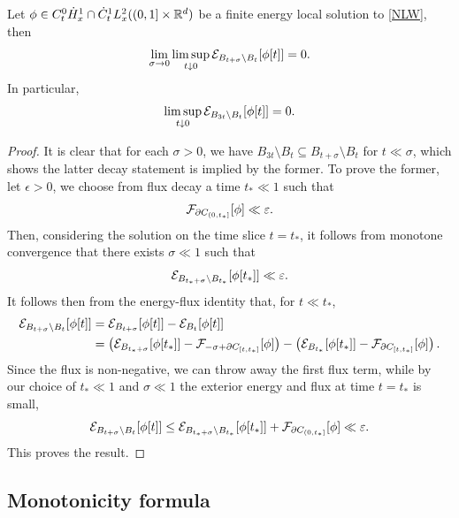 \begin{corollary}\label{cor:exterior}
	Let $\phi \in C^0_{t} \dot H^1_x \cap \dot C^1_{t} L^2_x ((0, 1] \times \mathbb R^d)$ be a finite energy local solution to \eqref{NLW}, then
		\[
			\lim_{\sigma \to 0} \limsup_{t \downarrow 0} \mathcal E_{B_{t + \sigma} \setminus B_{t}} [\phi[t]] = 0.
		\]
	In particular, 
		\[
			\limsup_{t \downarrow 0} \mathcal E_{B_{3t} \setminus B_{t}} [\phi[t]] = 0.
		\]	
\end{corollary}

\begin{proof}
	It is clear that for each $\sigma > 0$, we have $B_{3t} \setminus B_t \subseteq B_{t + \sigma} \setminus B_t$ for $t \ll \sigma$, which shows the latter decay statement is implied by the former. To prove the former, let $\epsilon > 0$, we choose from flux decay a time $t_* \ll 1$ such that
		\[
			\mathcal F_{\partial C_{(0, t_*]}} [\phi] \ll \varepsilon. 
		\]
	Then, considering the solution on the time slice $t = t_*$, it follows from monotone convergence that there exists $\sigma \ll 1$ such that 
		\[
			\mathcal E_{B_{t_* + \sigma} \setminus B_{t_*}} [\phi[t_*]] \ll \varepsilon.
		\]	
	It follows then from the energy-flux identity that, for $t \ll t_*$, 
		\begin{align*}
			 \mathcal E_{B_{t + \sigma} \setminus B_{t}} [\phi[t]] 
			 	&= \mathcal E_{B_{t + \sigma}} [\phi[t]] - \mathcal E_{B_{t}} [\phi[t]] \\
			 	&= \left(\mathcal E_{B_{t_* + \sigma}} [\phi[t_*]] - \mathcal F_{- \sigma + \partial C_{[t, t_*]}} [\phi] \right) - \left( \mathcal E_{B_{t_*}} [\phi[t_*]] - \mathcal F_{\partial C_{[t, t_*]}} [\phi] \right).
		\end{align*}
	Since the flux is non-negative, we can throw away the first flux term, while by our choice of $t_* \ll 1$ and $\sigma \ll 1$ the exterior energy and flux at time $t = t_*$ is small,
		\[
			 \mathcal E_{B_{t + \sigma} \setminus B_{t}} [\phi[t]] \leq  \mathcal E_{B_{t_* + \sigma} \setminus B_{t_*}} [\phi[t_*]] + \mathcal F_{\partial C_{(0, t_*]}} [\phi] \ll \varepsilon.  
		\]
	This proves the result.
\end{proof}



\subsection{Monotonicity formula}

